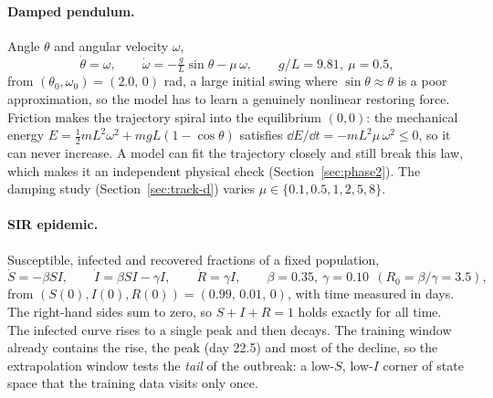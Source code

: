 \paragraph{Damped pendulum.} Angle $\theta$ and angular velocity $\omega$,
\begin{equation}
\dot\theta=\omega, \qquad \dot\omega=-\tfrac{g}{L}\sin\theta-\mu\,\omega,
\qquad g/L=9.81,\ \mu=0.5,
\label{eq:pendulum}
\end{equation}
from $(\theta_0,\omega_0)=(2.0,\,0)$ rad, a large initial swing where
$\sin\theta\approx\theta$ is a poor approximation, so the model has to learn
a genuinely nonlinear restoring force. Friction makes the trajectory spiral
into the equilibrium $(0,0)$: the mechanical energy
$E=\tfrac12 mL^2\omega^2+mgL(1-\cos\theta)$ satisfies
$\dd E/\dd t=-mL^2\mu\,\omega^2\le0$, so it can never increase. A model can
fit the trajectory closely and still break this law, which makes it an
independent physical check (Section~\ref{sec:phase2}). The damping study (Section~\ref{sec:track-d})
varies $\mu\in\{0.1,0.5,1,2,5,8\}$.

\paragraph{SIR epidemic.} Susceptible, infected and recovered fractions of a
fixed population,
\begin{equation}
\dot S=-\beta SI, \qquad \dot I=\beta SI-\gamma I, \qquad \dot R=\gamma I,
\qquad \beta=0.35,\ \gamma=0.10\ \ (R_0=\beta/\gamma=3.5),
\label{eq:sir}
\end{equation}
from $(S(0),I(0),R(0))=(0.99,\,0.01,\,0)$, with time measured in days. The
right-hand sides sum to zero, so $S+I+R=1$ holds exactly for all time. The
infected curve rises to a single peak and then decays. The training window
already contains the rise, the peak (day 22.5) and most of the decline, so
the extrapolation window tests the \emph{tail} of the outbreak: a
low-$S$, low-$I$ corner of state space that the training data visits only
once.

